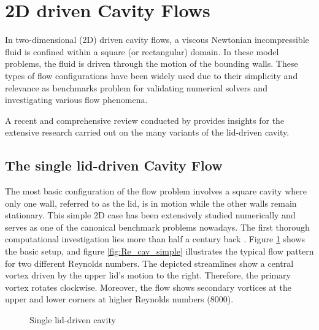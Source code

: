 
\section{2D driven Cavity Flows} \label{sec:driven_cav}

In two-dimensional (2D) driven cavity flows, a viscous Newtonian incompressible
fluid is confined within a square (or rectangular) domain. In these model
problems, the fluid is driven through the motion of the bounding walls. These
types of flow configurations have been widely used due to their simplicity and
relevance as benchmarks problem for validating numerical solvers and
investigating various flow phenomena.

A recent and comprehensive review conducted by \citet{kuhlmann2019} provides
insights for the extensive research carried out on the many variants of the
lid-driven cavity.

\subsection{The single lid-driven Cavity Flow}

The most basic configuration of the flow problem involves a square cavity where
only one wall, referred to as the lid, is in motion while the other walls
remain stationary. This simple 2D case has been extensively studied numerically
and serves as one of the canonical benchmark problems nowadays. The first
thorough computational investigation lies more than half a century back
\citep{burggraf1966}. Figure \ref{fig:cav_simple} shows the basic setup, and
figure \ref{fig:Re_cav_simple} illustrates the typical flow pattern for two
different Reynolds numbers. The depicted streamlines show a central vortex
driven by the upper lid's motion to the right. Therefore, the primary vortex
rotates clockwise. Moreover, the flow shows secondary vortices at the upper and
lower corners at higher Reynolds numbers ($8000$).

\begin{figure}[ht]
\centering
{}
\caption{Single lid-driven cavity}
\label{fig:cav_simple}
\end{figure}

